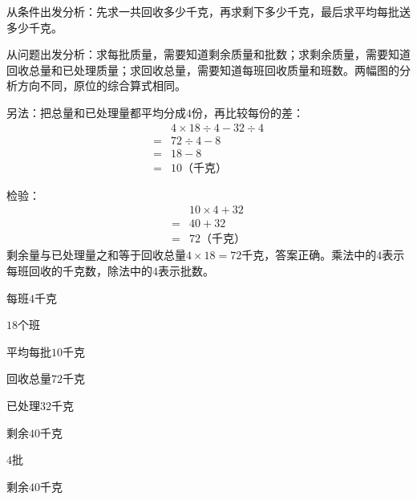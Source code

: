 \documentclass[multi=snippet,border=0pt]{standalone}
\newenvironment{snippet}[3]{\begin{minipage}{#1bp}\color{answerred}\fontsize{#2}{#3}\selectfont\raggedright}{\end{minipage}}
\begin{document}
\begin{snippet}{505}{11.5}{14}从条件出发分析：先求一共回收多少千克，再求剩下多少千克，最后求平均每批送多少千克。\par 从问题出发分析：求每批质量，需要知道剩余质量和批数；求剩余质量，需要知道回收总量和已处理质量；求回收总量，需要知道每班回收质量和班数。两幅图的分析方向不同，原位的综合算式相同。\par 另法：把总量和已处理量都平均分成\(4\)份，再比较每份的差：\[\begin{aligned}&4\times18\div4-32\div4\\={}&72\div4-8\\={}&18-8\\={}&10\text{（千克）}\end{aligned}\]\par 检验：\[\begin{aligned}&10\times4+32\\={}&40+32\\={}&72\text{（千克）}\end{aligned}\]剩余量与已处理量之和等于回收总量\(4\times18=72\)千克，答案正确。乘法中的\(4\)表示每班回收的千克数，除法中的\(4\)表示批数。\end{snippet}
\begin{snippet}{69.80000000000001}{8.5}{12.8}每班\(4\)千克\end{snippet}
\begin{snippet}{69.54999999999998}{8.5}{12.8}\(18\)个班\end{snippet}
\begin{snippet}{68.79999999999995}{8.5}{12.8}平均每批\(10\)千克\end{snippet}
\begin{snippet}{69.80000000000001}{8.5}{12.8}回收总量\(72\)千克\end{snippet}
\begin{snippet}{69.04999999999998}{8.5}{12.8}已处理\(32\)千克\end{snippet}
\begin{snippet}{72.54999999999995}{8.5}{12.8}剩余\(40\)千克\end{snippet}
\begin{snippet}{69.04999999999995}{8.5}{12.8}\(4\)批\end{snippet}
\begin{snippet}{77.05000000000001}{8.5}{12.8}剩余\(40\)千克\end{snippet}
\end{document}
